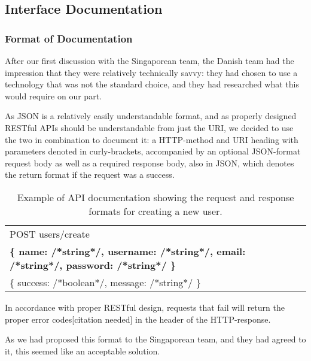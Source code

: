 \subsection{Interface Documentation}


\subsubsection{Format of Documentation}

After our first discussion with the Singaporean team, the Danish team had the impression that they were
relatively technically savvy: they had chosen to use a technology that was not the standard choice, and
they had researched what this would require on our part.

As JSON is a relatively easily understandable format, and as properly designed RESTful APIs should be
understandable from just the URI, we decided to use the two in combination to document it: a HTTP-method
and URI heading with parameters denoted in curly-brackets, accompanied by an optional JSON-format request
body as well as a required response body, also in JSON, which denotes the return format if the request was
a success.


\begin{table}[h]
    \begin{tabular}{ | l | }
        \hline
        POST users/create \\
        \textbf{\{ name: /*string*/, username: /*string*/, email: /*string*/, password: /*string*/ \}} \\
        \{ success: /*boolean*/, message: /*string*/ \} \\
        \hline
    \end{tabular}
    \caption{Example of API documentation showing the request and response formats for creating a new user.}
\end{table}


In accordance with proper RESTful design, requests that fail will return the proper error codes[citation
needed] in the header of the HTTP-response.

As we had proposed this format to the Singaporean team, and they had agreed to it, this seemed like an
acceptable solution.

